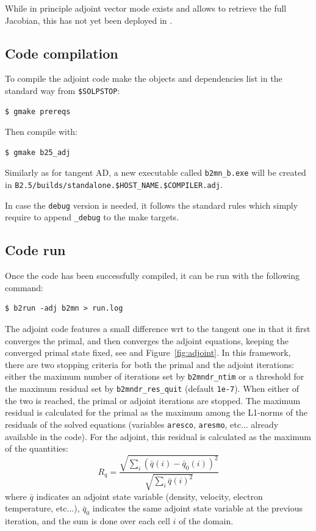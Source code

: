 While in principle adjoint vector mode exists and allows to retrieve the full Jacobian, this has not yet been deployed in \SOLPSITER.

\subsection{Code compilation}

To compile the adjoint code make the objects and dependencies list in the standard way from {\tt \$SOLPSTOP}:
\begin{verbatim}
$ gmake prereqs
\end{verbatim}
Then compile with:
\begin{verbatim}
$ gmake b25_adj
\end{verbatim}

Similarly as for tangent AD, a new executable called {\tt b2mn\_b.exe} will be created in {\tt B2.5/builds/standalone.\allowbreak\${HOST\_NAME}.\allowbreak\${COMPILER}.adj}.

In case the {\tt debug} version is needed, it follows the standard \SOLPSITER rules which simply require to append {\tt \_debug} to the make targets.

\subsection{Code run}\label{sec:run_adj}

Once the code has been successfully compiled, it can be run with the following command:
\begin{verbatim}
$ b2run -adj b2mn > run.log
\end{verbatim}

The adjoint code features a small difference wrt to the tangent one in that it first converges the primal, and then converges the adjoint equations, keeping the converged primal state fixed, see \cite{carlijcp} and Figure~\ref{fig:adjoint}. In this framework, there are two stopping criteria for both the primal and the adjoint iterations: either the maximum number of iterations set by {\tt b2mndr\_ntim} or a threshold for the maximum residual set by {\tt b2mndr\_res\_quit} (default {\tt 1e-7}). When either of the two is reached, the primal or adjoint iterations are stopped. The maximum residual is calculated for the primal as the maximum among the L1-norms of the residuals of the solved equations (variables {\tt aresco}, {\tt aresmo}, etc... already available in the code). For the adjoint, this residual is calculated as the maximum of the quantities:
\begin{equation}\label{eq:res}
R_q = \frac{\sqrt{\sum_{i} (\bar{q}(i) -\bar{q}_0(i))^2}}{\sqrt{\sum_{i} \bar{q}(i)^2}}
\end{equation}
where $\bar{q}$ indicates an adjoint state variable (density, velocity, electron temperature, etc...), $\bar{q}_0$ indicates the same adjoint state variable at the previous iteration, and the sum is done over each cell $i$ of the domain.

